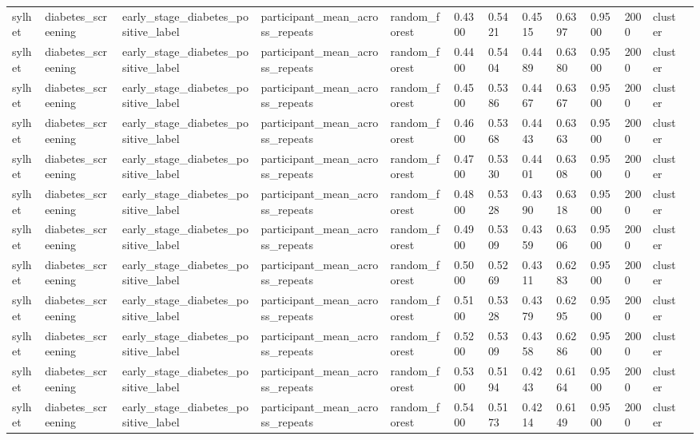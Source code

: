 \begin{tabular}{lllllllllllll}
sylhet & diabetes\_screening & early\_stage\_diabetes\_positive\_label & participant\_mean\_across\_repeats & random\_forest & 0.4300 & 0.5421 & 0.4515 & 0.6397 & 0.9500 & 2000 & cluster &  \\
sylhet & diabetes\_screening & early\_stage\_diabetes\_positive\_label & participant\_mean\_across\_repeats & random\_forest & 0.4400 & 0.5404 & 0.4489 & 0.6380 & 0.9500 & 2000 & cluster &  \\
sylhet & diabetes\_screening & early\_stage\_diabetes\_positive\_label & participant\_mean\_across\_repeats & random\_forest & 0.4500 & 0.5386 & 0.4467 & 0.6367 & 0.9500 & 2000 & cluster &  \\
sylhet & diabetes\_screening & early\_stage\_diabetes\_positive\_label & participant\_mean\_across\_repeats & random\_forest & 0.4600 & 0.5368 & 0.4443 & 0.6363 & 0.9500 & 2000 & cluster &  \\
sylhet & diabetes\_screening & early\_stage\_diabetes\_positive\_label & participant\_mean\_across\_repeats & random\_forest & 0.4700 & 0.5330 & 0.4401 & 0.6308 & 0.9500 & 2000 & cluster &  \\
sylhet & diabetes\_screening & early\_stage\_diabetes\_positive\_label & participant\_mean\_across\_repeats & random\_forest & 0.4800 & 0.5328 & 0.4390 & 0.6318 & 0.9500 & 2000 & cluster &  \\
sylhet & diabetes\_screening & early\_stage\_diabetes\_positive\_label & participant\_mean\_across\_repeats & random\_forest & 0.4900 & 0.5309 & 0.4359 & 0.6306 & 0.9500 & 2000 & cluster &  \\
sylhet & diabetes\_screening & early\_stage\_diabetes\_positive\_label & participant\_mean\_across\_repeats & random\_forest & 0.5000 & 0.5269 & 0.4311 & 0.6283 & 0.9500 & 2000 & cluster &  \\
sylhet & diabetes\_screening & early\_stage\_diabetes\_positive\_label & participant\_mean\_across\_repeats & random\_forest & 0.5100 & 0.5328 & 0.4379 & 0.6295 & 0.9500 & 2000 & cluster &  \\
sylhet & diabetes\_screening & early\_stage\_diabetes\_positive\_label & participant\_mean\_across\_repeats & random\_forest & 0.5200 & 0.5309 & 0.4358 & 0.6286 & 0.9500 & 2000 & cluster &  \\
sylhet & diabetes\_screening & early\_stage\_diabetes\_positive\_label & participant\_mean\_across\_repeats & random\_forest & 0.5300 & 0.5194 & 0.4243 & 0.6164 & 0.9500 & 2000 & cluster &  \\
sylhet & diabetes\_screening & early\_stage\_diabetes\_positive\_label & participant\_mean\_across\_repeats & random\_forest & 0.5400 & 0.5173 & 0.4214 & 0.6149 & 0.9500 & 2000 & cluster &  \\

\end{tabular}

